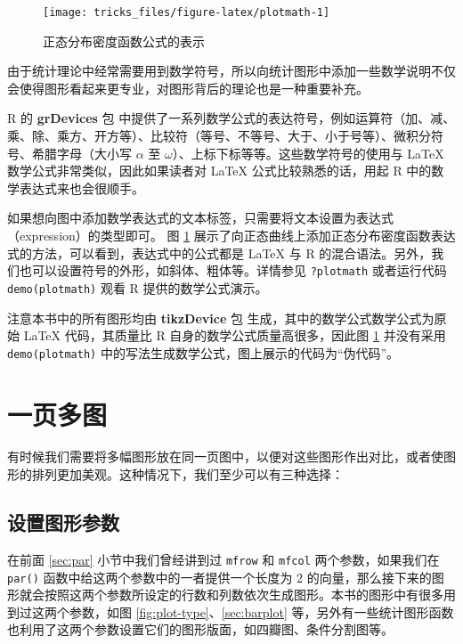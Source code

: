 \documentclass[
  b5paper,
  UTF8,twoside]{book}
\begin{document}
\begin{figure}

{\centering \texttt{[image: tricks\_files/figure-latex/plotmath-1]} 

}

\caption{正态分布密度函数公式的表示}\label{fig:plotmath}
\end{figure}

由于统计理论中经常需要用到数学符号，所以向统计图形中添加一些数学说明不仅会使得图形看起来更专业，对图形背后的理论也是一种重要补充。

R 的 \textbf{grDevices} 包 中提供了一系列数学公式的表达符号，例如运算符（加、减、乘、除、乘方、开方等）、比较符（等号、不等号、大于、小于号等）、微积分符号、希腊字母（大小写 \(\alpha\) 至 \(\omega\)）、上标下标等等。这些数学符号的使用与 LaTeX 数学公式非常类似，因此如果读者对 LaTeX 公式比较熟悉的话，用起 R 中的数学表达式来也会很顺手。

如果想向图中添加数学表达式的文本标签，只需要将文本设置为表达式（expression）的类型即可。 图 \ref{fig:plotmath} 展示了向正态曲线上添加正态分布密度函数表达式的方法，可以看到，表达式中的公式都是 LaTeX 与 R 的混合语法。另外，我们也可以设置符号的外形，如斜体、粗体等。详情参见 \texttt{?plotmath} 或者运行代码 \texttt{demo(plotmath)} 观看 R 提供的数学公式演示。

注意本书中的所有图形均由 \textbf{tikzDevice} 包 \citep{tikzDevice} 生成，其中的数学公式数学公式为原始 LaTeX 代码，其质量比 R 自身的数学公式质量高很多，因此图 \ref{fig:plotmath} 并没有采用 \texttt{demo(plotmath)} 中的写法生成数学公式，图上展示的代码为``伪代码''。

\hypertarget{sec:multipage}{%
\section{一页多图}\label{sec:multipage}}

有时候我们需要将多幅图形放在同一页图中，以便对这些图形作出对比，或者使图形的排列更加美观。这种情况下，我们至少可以有三种选择：

\hypertarget{ux8bbeux7f6eux56feux5f62ux53c2ux6570}{%
\subsection{设置图形参数}\label{ux8bbeux7f6eux56feux5f62ux53c2ux6570}}

在前面 \ref{sec:par} 小节中我们曾经讲到过 \texttt{mfrow} 和 \texttt{mfcol} 两个参数，如果我们在 \texttt{par()} 函数中给这两个参数中的一者提供一个长度为 2 的向量，那么接下来的图形就会按照这两个参数所设定的行数和列数依次生成图形。本书的图形中有很多用到过这两个参数，如图 \ref{fig:plot-type}、\ref{sec:barplot} 等，另外有一些统计图形函数也利用了这两个参数设置它们的图形版面，如四瓣图、条件分割图等。
\end{document}
